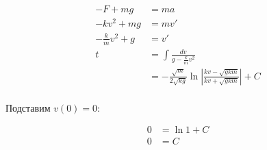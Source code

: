 \begin{align*}
    -F + mg             & = ma                                                                                    \\
    -kv^2 + mg          & = mv'                                                                                   \\
    -\frac{k}{m}v^2 + g & = v'                                                                                    \\
    t                   & = \int \frac{dv}{g-\frac{k}{m}v^2}                                                      \\
                        & = - \frac{\sqrt m}{2\sqrt {kg}} \ln\left|\frac{kv-\sqrt{gkm}}{kv+\sqrt{gkm}}\right| + C \\
\end{align*}

Подставим $v(0) = 0$:

\begin{align*}
    0 & = \ln 1 + C \\
    0 & = C         \\
\end{align*}

